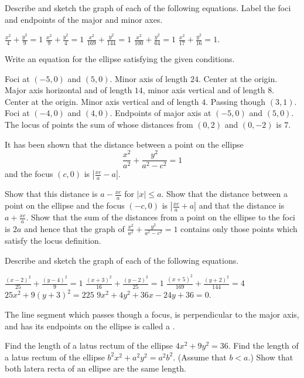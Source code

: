 \begin{exercises}

Describe and sketch the graph of each of the following equations.
Label the foci and endpoints of the major and minor axes.
\begin{exenum}
\sx
$\frac{x^2}4 + \frac{y^2}9 = 1$
\sx
$\frac{x^2}9 + \frac{y^2}4 = 1$
\sx
$\frac{x^2}{169} + \frac{y^2}{144} = 1$
\sx
$\frac{x^2}{100} + \frac{y^2}{64} = 1$
\sx
$\frac{x^2}{17} + \frac{y^2}{16} = 1$.
\end{exenum}

Write an equation for the ellipse satisfying the given conditions.
\begin{exenum}
\sx
Foci at $(-5,0)$ and $(5,0)$.  Minor axis of length $24$.
\sx
Center at the origin.  Major axis horizontal and of length $14$,
minor axis vertical and of length $8$.
\sx
Center at the origin.  Minor axis vertical and of length $4$.
Passing though $(3,1)$.
\sx
Foci at $(-4,0)$ and $(4,0)$.
Endpoints of major axis at $(-5,0)$ and $(5,0)$.
\sx
The locus of points the sum of whose distances from
$(0,2)$ and $(0,-2)$ is $7$.
\end{exenum}

It has been shown that the distance between a point on
the ellipse
\[
\frac{x^2}{a^2} + \frac{y^2}{a^2-c^2} = 1
\]
and the focus $(c,0)$ is
$\left| \frac{xc}a - a \right|$.
\begin{exenum}
\sx
Show that this distance is $a - \frac{xc}a$ for
$|x| \leq a$.
\sx
Show that the distance between a point on the ellipse
and the focus $(-c,0)$ is $\left| \frac{xc}a + a \right|$
and that the distance is $a + \frac{xc}a$.
\sx
Show that the sum of the distances from a point on the
ellipse to the foci is $2a$ and hence that the graph of
$\frac{x^2}{a^2} + \frac{y^2}{a^2-c^2} = 1$
contains only those points which satisfy the locus definition.
\end{exenum}

Describe and sketch the graph of each of the following equations.
\begin{exenum}
\sx
$\frac{(x-2)^2}{25} + \frac{(y-4)^2}{9} = 1$
\sx
$\frac{(x+3)^2}{16} + \frac{(y-2)^2}{25} = 1$
\sx
$\frac{(x+5)^2}{169} + \frac{(y+2)^2}{144} = 4$
\sx
$25x^2 + 9(y+3)^2 = 225$
\sx
$9x^2 + 4y^2 + 36x - 24y + 36 = 0$.
\end{exenum}

The line segment which passes though a focus,
is perpendicular to the major axis,
and has its endpoints on the ellipse is called a
.
\begin{exenum}
\sx
Find the length of a latus rectum of the ellipse
$4x^2 + 9y^2 = 36$.
\sx
Find the length of a latus rectum of the ellipse
$b^2x^2 + a^2y^2 = a^2b^2$.  (Assume that $b < a$.)
\sx
Show that both latera recta of an ellipse are the same length.
\end{exenum}


\end{exercises}
